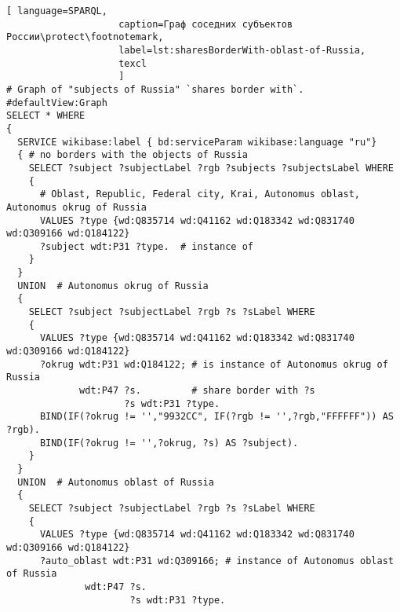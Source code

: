 \lstset{numbers=left, firstnumber=1, frame=single}
\begin{lstlisting}[ language=SPARQL, 
                    caption=Граф соседних субъектов России\protect\footnotemark,
                    label=lst:sharesBorderWith-oblast-of-Russia,
                    texcl 
                    ]
# Graph of "subjects of Russia" `shares border with`. 
#defaultView:Graph
SELECT * WHERE 
{
  SERVICE wikibase:label { bd:serviceParam wikibase:language "ru"}
  { # no borders with the objects of Russia
    SELECT ?subject ?subjectLabel ?rgb ?subjects ?subjectsLabel WHERE
    {
      # Oblast, Republic, Federal city, Krai, Autonomus oblast, Autonomus okrug of Russia
      VALUES ?type {wd:Q835714 wd:Q41162 wd:Q183342 wd:Q831740 wd:Q309166 wd:Q184122}
      ?subject wdt:P31 ?type.  # instance of
    }
  }
  UNION  # Autonomus okrug of Russia
  { 
    SELECT ?subject ?subjectLabel ?rgb ?s ?sLabel WHERE
    {
      VALUES ?type {wd:Q835714 wd:Q41162 wd:Q183342 wd:Q831740 wd:Q309166 wd:Q184122}
      ?okrug wdt:P31 wd:Q184122; # is instance of Autonomus okrug of Russia
             wdt:P47 ?s.         # share border with ?s
                     ?s wdt:P31 ?type.
      BIND(IF(?okrug != '',"9932CC", IF(?rgb != '',?rgb,"FFFFFF")) AS ?rgb).
      BIND(IF(?okrug != '',?okrug, ?s) AS ?subject).
    }
  }
  UNION  # Autonomus oblast of Russia
  {
    SELECT ?subject ?subjectLabel ?rgb ?s ?sLabel WHERE
    {
      VALUES ?type {wd:Q835714 wd:Q41162 wd:Q183342 wd:Q831740 wd:Q309166 wd:Q184122}
      ?auto_oblast wdt:P31 wd:Q309166; # instance of Autonomus oblast of Russia
              wdt:P47 ?s.
                      ?s wdt:P31 ?type.
  

\end{lstlisting}
